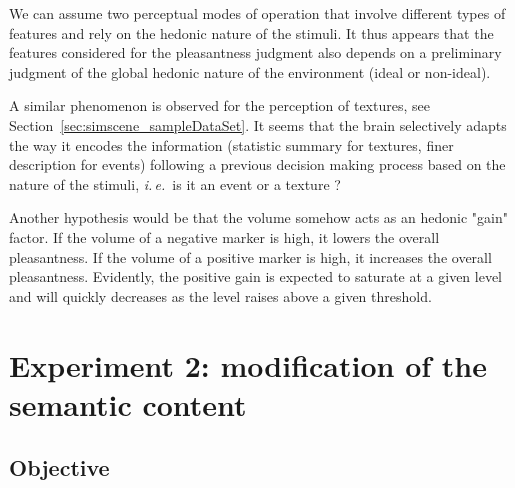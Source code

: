 \documentclass[12pt]{elsarticle}
\newcommand{\ie}{\emph{i.\,e.}}
\begin{document}
We can assume two perceptual modes of operation that involve different types of features and rely on the hedonic nature of the stimuli. It thus appears that the features considered for the pleasantness judgment also depends on a preliminary judgment of the global hedonic nature of the environment (ideal or non-ideal).

A similar phenomenon is observed for the perception of textures, see Section~\ref{sec:simscene_sampleDataSet}. It seems that the brain selectively adapts the way it encodes the information (statistic summary for textures, finer description for events) following a previous decision making process based on the nature of the stimuli, \ie~is it an event or a texture ?


Another hypothesis would be that the volume somehow acts as an hedonic "gain" factor. If the volume of a negative marker is high, it lowers the overall pleasantness. If the volume of a positive marker is high, it increases the overall pleasantness. Evidently, the positive gain is expected to saturate at a given level and will quickly decreases as the level raises above a given threshold.


\section{Experiment 2: modification of the semantic content}
\label{sec:modification}

\subsection{Objective}

\end{document}
